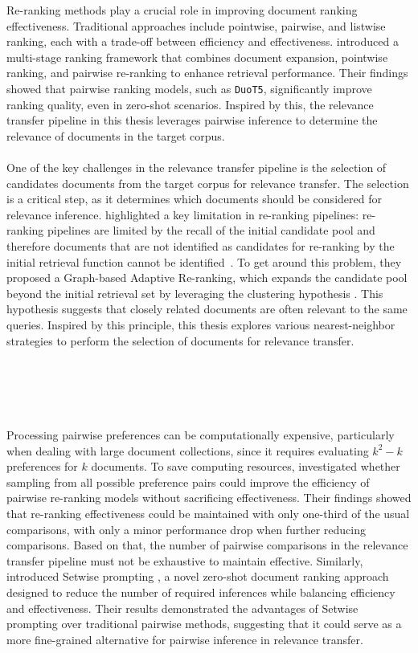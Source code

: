 Re-ranking methods play a crucial role in improving document ranking effectiveness. Traditional approaches include pointwise, pairwise, and listwise ranking, each with a trade-off between efficiency and effectiveness. \citet{pradeep:2021} introduced a multi-stage ranking framework that combines document expansion, pointwise ranking, and pairwise re-ranking to enhance retrieval performance. Their findings showed that pairwise ranking models, such as \texttt{DuoT5}, significantly improve ranking quality, even in zero-shot scenarios. Inspired by this, the relevance transfer pipeline in this thesis leverages pairwise inference to determine the relevance of documents in the target corpus.
\\\\
One of the key challenges in the relevance transfer pipeline is the selection of candidates documents from the target corpus for relevance transfer. The selection is a critical step, as it determines which documents should be considered for relevance inference. \mbox{\citet{macavaney:2022}} highlighted a key limitation in re-ranking pipelines: \glqq re-ranking pipelines are limited by the recall of the initial candidate pool and therefore documents that are not identified as candidates for re-ranking by the initial retrieval function cannot be \mbox{identified \grqq{}}. To get around this problem, they proposed a Graph-based Adaptive Re-ranking, which expands the candidate pool beyond the initial retrieval set by leveraging the clustering hypothesis \citep{jardine:1971}. This hypothesis suggests that closely related documents are often relevant to the same queries. Inspired by this principle, this thesis explores various nearest-neighbor strategies to perform the selection of documents for relevance transfer.
\\\\\\\\\\\\
Processing pairwise preferences can be computationally expensive, particularly when dealing with large document collections, since it requires evaluating $k^2-k$ preferences for $k$ documents. To save computing resources, \mbox{\citet{gienapp:2022}} investigated whether sampling from all possible preference pairs could improve the efficiency of pairwise re-ranking models without sacrificing effectiveness. Their findings showed that re-ranking effectiveness could be maintained with only one-third of the usual comparisons, with only a minor performance drop when further reducing comparisons. Based on that, the number of pairwise comparisons in the relevance transfer pipeline must not be exhaustive to maintain effective. Similarly, \citet{zhuang:2024} introduced \glqq Setwise prompting \grqq{}, a novel zero-shot document ranking approach designed to reduce the number of required inferences while balancing efficiency and effectiveness. Their results demonstrated the advantages of Setwise prompting over traditional pairwise methods, suggesting that it could serve as a more fine-grained alternative for pairwise inference in relevance transfer.
